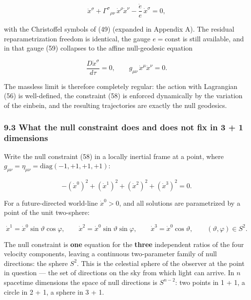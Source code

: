 \documentclass[
]{article}
\begin{document}
\[\ddot{x}^{\sigma} + \Gamma^{\sigma}{}_{\rho\nu}\, \dot{x}^{\rho} \dot{x}^{\nu} - \frac{\dot{e}}{e}\, \dot{x}^{\sigma} = 0, \tag{59}\]

with the Christoffel symbols of (49) (expanded in Appendix A). The
residual reparametrization freedom is identical, the gauge
\(e = \mathrm{const}\) is still available, and in that gauge (59)
collapses to the affine null-geodesic equation

\[\frac{D \dot{x}^{\sigma}}{d\tau} = 0, \qquad g_{\mu\nu}\, \dot{x}^{\mu} \dot{x}^{\nu} = 0. \tag{60}\]

The massless limit is therefore completely regular: the action with
Lagrangian (56) is well-defined, the constraint (58) is enforced
dynamically by the variation of the einbein, and the resulting
trajectories are exactly the null geodesics.

\hypertarget{what-the-null-constraint-does-and-does-not-fix-in-3-1-dimensions}{%
\subsubsection{9.3 What the null constraint does and does not fix in 3 +
1
dimensions}\label{what-the-null-constraint-does-and-does-not-fix-in-3-1-dimensions}}

Write the null constraint (58) in a locally inertial frame at a point,
where \(g_{\mu\nu} = \eta_{\mu\nu} = \mathrm{diag}(-1, +1, +1, +1)\):

\[- \left( \dot{x}^{0} \right)^{2} + \left( \dot{x}^{1} \right)^{2} + \left( \dot{x}^{2} \right)^{2} + \left( \dot{x}^{3} \right)^{2} = 0. \tag{61}\]

For a future-directed world-line \(\dot{x}^{0} > 0\), and all solutions
are parametrized by a point of the unit two-sphere:

\[\dot{x}^{1} = \dot{x}^{0} \sin\vartheta \cos\varphi, \qquad \dot{x}^{2} = \dot{x}^{0} \sin\vartheta \sin\varphi, \qquad \dot{x}^{3} = \dot{x}^{0} \cos\vartheta, \qquad (\vartheta, \varphi) \in S^{2}. \tag{62}\]

The null constraint is \textbf{one} equation for the \textbf{three}
independent ratios of the four velocity components, leaving a continuous
two-parameter family of null directions: the sphere \(S^{2}\). This is
the celestial sphere of the observer at the point in question --- the
set of directions on the sky from which light can arrive. In \(n\)
spacetime dimensions the space of null directions is \(S^{n-2}\): two
points in 1 + 1, a circle in 2 + 1, a sphere in 3 + 1.
\end{document}
